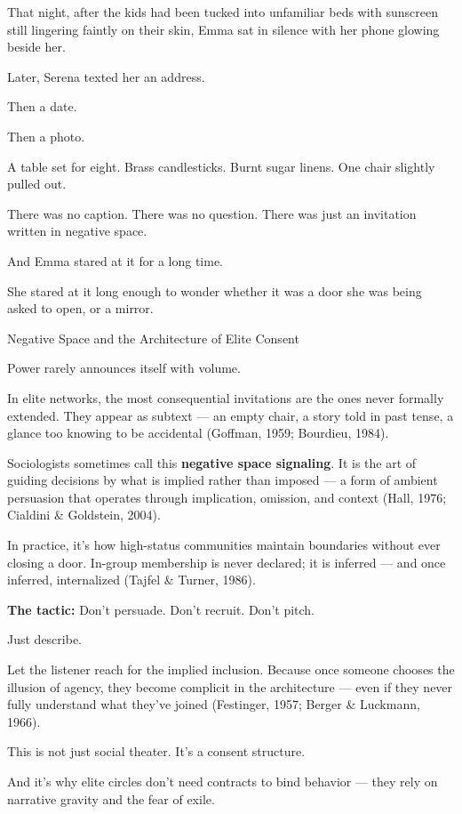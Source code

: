 That night, after the kids had been tucked into unfamiliar beds with sunscreen still lingering faintly 
on their skin, Emma sat in silence with her phone glowing beside her.

Later, Serena texted her an address.

Then a date.

Then a photo.

A table set for eight. Brass candlesticks. Burnt sugar linens.
One chair slightly pulled out.

There was no caption.
There was no question.
There was just an invitation written in negative space.

And Emma stared at it for a long time.

She stared at it long enough to wonder whether it was a door she was being asked to open,
or a mirror.

\medskip

\begin{PsychologicalSidebar}{Negative Space and the Architecture of Elite Consent}

  Power rarely announces itself with volume.
  
  In elite networks, the most consequential invitations are the ones never formally extended.  
  They appear as subtext — an empty chair, a story told in past tense, a glance too knowing to be accidental 
  (Goffman, 1959; Bourdieu, 1984).
  
  \medskip
  
  Sociologists sometimes call this \textbf{negative space signaling}.  
  It is the art of guiding decisions by what is implied rather than imposed — a form of ambient persuasion 
  that operates through implication, omission, and context (Hall, 1976; Cialdini \& Goldstein, 2004).  
  
  \medskip
  
  In practice, it’s how high-status communities maintain boundaries without ever closing a door.  
  In-group membership is never declared; it is inferred — and once inferred, internalized 
  (Tajfel \& Turner, 1986).
  
  \medskip
  
  \textbf{The tactic:} Don’t persuade. Don’t recruit. Don’t pitch.
  
  \medskip
  
  Just describe.
  
  \medskip
  
  Let the listener reach for the implied inclusion.  
  Because once someone chooses the illusion of agency, they become complicit in the architecture —  
  even if they never fully understand what they’ve joined (Festinger, 1957; Berger \& Luckmann, 1966).
  
  \medskip
  
  This is not just social theater.  
  It’s a consent structure.

  \medskip
  
  And it’s why elite circles don’t need contracts to bind behavior —  
  they rely on narrative gravity and the fear of exile.
  
\end{PsychologicalSidebar}
  

